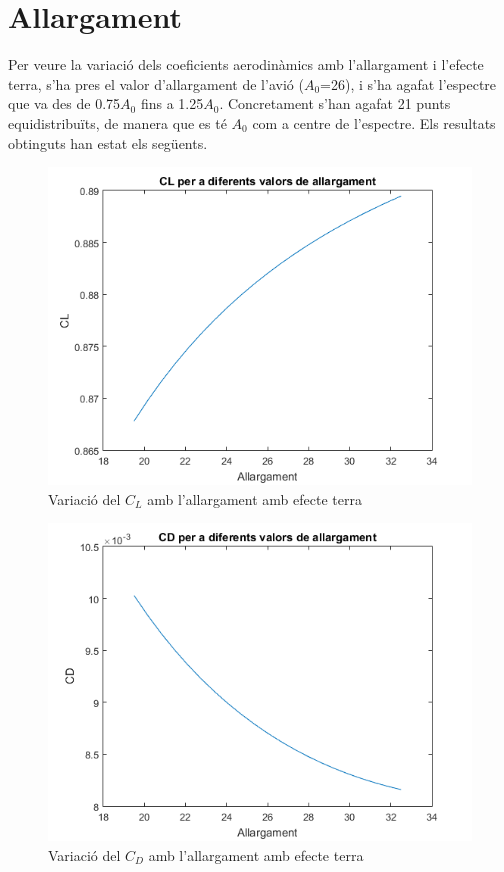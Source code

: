 \section{Allargament}

Per veure la variació dels coeficients aerodinàmics amb l'allargament i l'efecte terra, s'ha pres el valor d'allargament de l'avió ($A_{0}$=26), i s'ha agafat l'espectre que va des de 0.75$A_{0}$ fins a 1.25$A_{0}$. Concretament s'han agafat 21 punts equidistribuïts, de manera que es té $A_{0}$ com a centre de l'espectre. Els resultats obtinguts han estat els següents.

\begin{figure}[H]
	\centering
	\includegraphics[]{./plots/CL_A}
	\caption{Variació del $C_{L}$ amb l'allargament amb efecte terra}
	\label{CL_A}
\end{figure}

\begin{figure}[H]
	\centering
	\includegraphics[]{./plots/CD_A}
	\caption{Variació del $C_{D}$ amb l'allargament amb efecte terra}
	\label{CD_A}
\end{figure}

